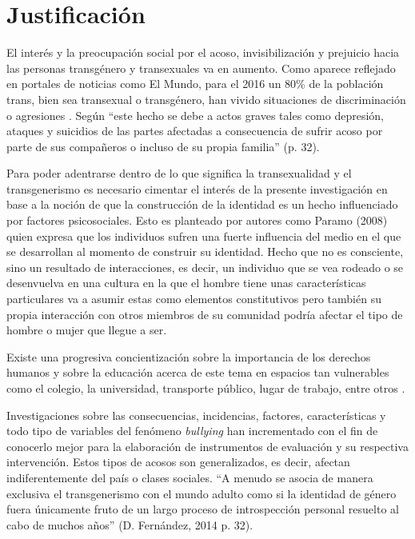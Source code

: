 \section{Justificación}

El interés y la preocupación social
por el acoso, invisibilización y prejuicio hacia las personas transgénero y transexuales va en
aumento. Como aparece reflejado en portales de noticias como El Mundo, para
el 2016 un 80\% de la población trans, bien sea transexual o transgénero,
han vivido situaciones de discriminación o agresiones \parencite{Alpuente2016}.
Según \textcite{Fernandez2014} “este hecho se debe a actos graves tales como
depresión, ataques y suicidios de las partes afectadas a consecuencia de sufrir
acoso por parte de sus compañeros o incluso de su propia familia” (p. 32).

Para poder adentrarse dentro de lo que significa la transexualidad y el
transgenerismo es necesario cimentar el interés de la presente investigación en
base a la noción de que la construcción de la identidad es un hecho influenciado
por factores psicosociales. Esto es planteado por autores como Paramo (2008) quien
expresa que los individuos sufren una fuerte influencia del medio en el que se
desarrollan al momento de construir su identidad. Hecho que no es consciente,
sino un resultado de interacciones, es decir, un individuo que se vea rodeado o
se desenvuelva en una cultura en la que el hombre tiene unas características
particulares va a asumir estas como elementos constitutivos pero también su
propia interacción con otros miembros de su comunidad podría afectar el tipo de
hombre o mujer que llegue a ser.

Existe una progresiva concientización sobre la importancia de los derechos
humanos y sobre la educación acerca de este tema en espacios tan vulnerables
como el colegio, la universidad, transporte público, lugar de trabajo, entre
otros \parencite{Fernandez2014}.

Investigaciones sobre las consecuencias, incidencias, factores, características
y todo tipo de variables del fenómeno \emph{bullying} han incrementado con el
fin de conocerlo mejor para la elaboración de instrumentos de evaluación y su
respectiva intervención. Estos tipos de acosos son generalizados, es decir,
afectan indiferentemente del país o clases sociales. “A menudo se asocia de
manera exclusiva el transgenerismo con el mundo adulto como si la identidad de
género fuera únicamente fruto de un largo proceso de introspección personal
resuelto al cabo de muchos años” (D. Fernández, 2014 p. 32).

